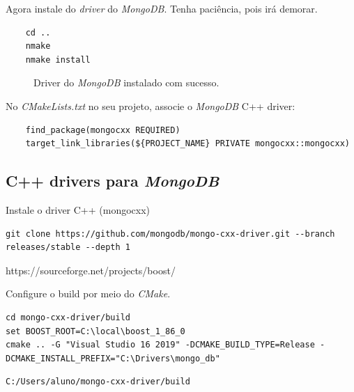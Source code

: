 \documentclass[a4paper,11pt]{article}
\newcommand{\cmake}{\textit{CMake}}
\newcommand{\mongo}{\textit{MongoDB}}
\begin{document}
Agora instale do \textit{driver} do \mongo{}. Tenha paciência, pois irá demorar.
\begin{mdframed}
\begin{verbatim}
	cd ..
	nmake
	nmake install
\end{verbatim}
\end{mdframed}

\begin{figure}[H]
	\centering
	\caption{Driver do \mongo{} instalado com sucesso.}\label{fig:mongodb_lib_installed}
\end{figure}


No \textit{CMakeLists.txt} no seu projeto, associe o \mongo{} C++ driver:

\begin{verbatim}
	find_package(mongocxx REQUIRED)
	target_link_libraries(${PROJECT_NAME} PRIVATE mongocxx::mongocxx)
\end{verbatim}

\subsection*{C++ drivers para \mongo{}}

Instale o driver C++ (mongocxx)

\begin{verbatim}
git clone https://github.com/mongodb/mongo-cxx-driver.git --branch releases/stable --depth 1
\end{verbatim}


https://sourceforge.net/projects/boost/


Configure o build por meio do \cmake{}.

\begin{verbatim}
cd mongo-cxx-driver/build
set BOOST_ROOT=C:\local\boost_1_86_0
cmake .. -G "Visual Studio 16 2019" -DCMAKE_BUILD_TYPE=Release -DCMAKE_INSTALL_PREFIX="C:\Drivers\mongo_db"
\end{verbatim}

\begin{verbatim}
C:/Users/aluno/mongo-cxx-driver/build
\end{verbatim}
\end{document}
